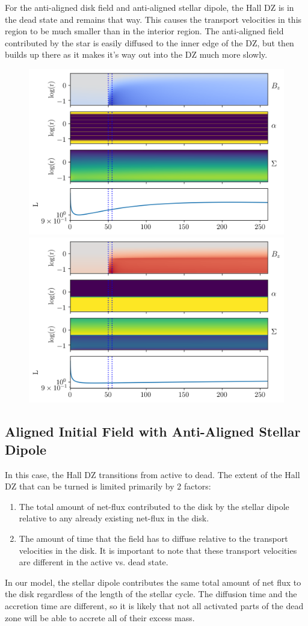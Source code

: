 For the anti-aligned disk field and anti-aligned stellar dipole, the Hall DZ is in the dead state and remains that way.  This causes the transport velocities in this region to be much smaller than in the interior region.  The anti-aligned field contributed by the star is easily diffused to the inner edge of the DZ, but then builds up there as it makes it's way out into the DZ much more slowly.

\begin{figure}[h!]
\centering
\includegraphics[width=0.45\columnwidth]{figs/figsChapter3/run3113/MST1.png}
\includegraphics[width=0.45\columnwidth]{figs/figsChapter3/run3112/MST1.png}
\caption{}
\label{fiStExample}
\end{figure}

 
\subsection{Aligned Initial Field with Anti-Aligned Stellar Dipole}
In this case, the Hall DZ transitions from active to dead.  The extent of the Hall DZ that can be turned is limited primarily by 2 factors:
\begin{enumerate}
\item{The total amount of net-flux contributed to the disk by the stellar dipole relative to any already existing net-flux in the disk.}
\item{The amount of time that the field has to diffuse relative to the transport velocities in the disk.  It is important to note that these transport velocities are different in the active vs. dead state. }
\end{enumerate}
In our model, the stellar dipole contributes the same total amount of net flux to the disk regardless of the length of the stellar cycle.  The diffusion time and the accretion time are different, so it is likely that not all activated parts of the dead zone will be able to accrete all of their excess mass.


